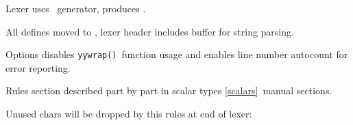 \label{lexer}

Lexer uses \ generator, produces .
\bigskip

All defines moved to , lexer header includes
buffer for string parsing.


Options disables \verb|yywrap()|\ function usage and enables line number
autocount for error reporting.


Rules section described part by part in scalar types \ref{scalars}\ manual
sections.


Unused chars will be dropped by this rules at end of lexer:

